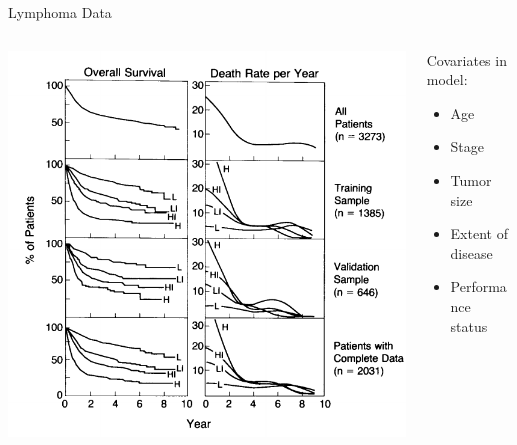 \documentclass[11pt]{beamer}
\begin{document}
\begin{frame}{Lymphoma Data}

\begin{columns}[c]

\begin{column}{0.65\textwidth}


\begin{center}
\includegraphics[width=1.0\textwidth]{./figures/nejm_curves.pdf}
\end{center}

\end{column}


\begin{column}{0.35\textwidth}

Covariates in model: 
\begin{itemize}

  \item Age

  \item Stage

  \item Tumor size

  \item Extent of disease

  \item Performance status

\end{itemize}
\end{column}


\end{columns}

\end{frame}
\end{document}
